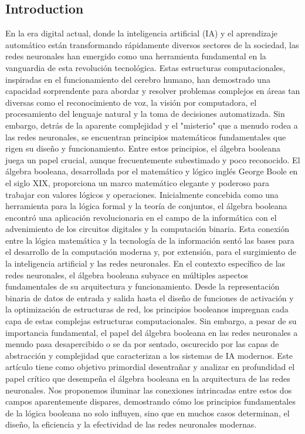 \documentclass{article}
\begin{document}
\vspace{0.1cm}
\begin{multicols}{2}
\vspace{0.1cm}
\section*{Introduction}
En la era digital actual, donde la inteligencia artificial (IA) y el aprendizaje 
automático están transformando rápidamente diversos sectores de la sociedad, las 
redes neuronales han emergido como una herramienta fundamental en la vanguardia de 
esta revolución tecnológica. Estas estructuras computacionales, inspiradas en el 
funcionamiento del cerebro humano, han demostrado una capacidad sorprendente para 
abordar y resolver problemas complejos en áreas tan diversas como el reconocimiento 
de voz, la visión por computadora, el procesamiento del lenguaje natural y la toma 
de decisiones automatizada. Sin embargo, detrás de la aparente complejidad y el "misterio" 
que a menudo rodea a las redes neuronales, se encuentran principios matemáticos fundamentales 
que rigen su diseño y funcionamiento. Entre estos principios, el álgebra booleana juega 
un papel crucial, aunque frecuentemente subestimado y poco reconocido.
El álgebra booleana, desarrollada por el matemático y lógico inglés George Boole en el 
siglo XIX, proporciona un marco matemático elegante y poderoso para trabajar con valores 
lógicos y operaciones. Inicialmente concebida como una herramienta para la lógica formal 
y la teoría de conjuntos, el álgebra booleana encontró una aplicación revolucionaria en el 
campo de la informática con el advenimiento de los circuitos digitales y la computación 
binaria. Esta conexión entre la lógica matemática y la tecnología de la información sentó 
las bases para el desarrollo de la computación moderna y, por extensión, para el surgimiento 
de la inteligencia artificial y las redes neuronales.
En el contexto específico de las redes neuronales, el álgebra booleana subyace en múltiples 
aspectos fundamentales de su arquitectura y funcionamiento. Desde la representación binaria 
de datos de entrada y salida hasta el diseño de funciones de activación y la optimización de 
estructuras de red, los principios booleanos impregnan cada capa de estas complejas estructuras 
computacionales. Sin embargo, a pesar de su importancia fundamental, el papel del álgebra 
booleana en las redes neuronales a menudo pasa desapercibido o se da por sentado, oscurecido 
por las capas de abstracción y complejidad que caracterizan a los sistemas de IA modernos.
Este artículo tiene como objetivo primordial desentrañar y analizar en profundidad el 
papel crítico que desempeña el álgebra booleana en la arquitectura de las redes neuronales. 
Nos proponemos iluminar las conexiones intrincadas entre estos dos campos aparentemente 
dispares, demostrando cómo los principios fundamentales de la lógica booleana no solo 
influyen, sino que en muchos casos determinan, el diseño, la eficiencia y la efectividad 
de las redes neuronales modernas.


\end{multicols}
\end{document}
